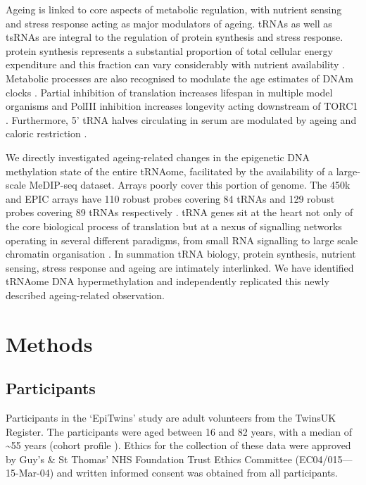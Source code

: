 \documentclass[
]{book}
\begin{document}
Ageing is linked to core aspects of metabolic regulation, with nutrient sensing and stress response acting as major modulators of ageing.
tRNAs as well as tsRNAs are integral to the regulation of protein synthesis and stress response.
protein synthesis represents a substantial proportion of total cellular energy expenditure and this fraction can vary considerably with nutrient availability \citep{Pace2006}.
Metabolic processes are also recognised to modulate the age estimates of DNAm clocks \citep{Nwanaji-Enwerem2018}.
Partial inhibition of translation increases lifespan in multiple model organisms \citep{Hansen2007} and PolIII inhibition increases longevity acting downstream of TORC1 \citep{Filer2017}.
Furthermore, 5' tRNA halves circulating in serum are modulated by ageing and caloric restriction \citep{Dhahbi2013}.

We directly investigated ageing-related changes in the epigenetic DNA methylation state of the entire tRNAome, facilitated by the availability of a large-scale MeDIP-seq dataset.
Arrays poorly cover this portion of genome.
The 450k and EPIC arrays have 110 robust probes covering 84 tRNAs and 129 robust probes covering 89 tRNAs respectively \citep{Zhou2017}.
tRNA genes sit at the heart not only of the core biological process of translation but at a nexus of signalling networks operating in several different paradigms, from small RNA signalling to large scale chromatin organisation \citep{VanBortle2017}.
In summation tRNA biology, protein synthesis, nutrient sensing, stress response and ageing are intimately interlinked.
We have identified tRNAome DNA hypermethylation and independently replicated this newly described ageing-related observation.

\newpage

\hypertarget{Methods}{%
\section{Methods}\label{Methods}}

\hypertarget{participants}{%
\subsection{Participants}\label{participants}}

Participants in the `EpiTwins' study are adult volunteers from the TwinsUK Register.
The participants were aged between 16 and 82 years, with a median of \textasciitilde55 years (cohort profile \citep{Moayyeri2013}).
Ethics for the collection of these data were approved by Guy's \& St Thomas' NHS Foundation Trust Ethics Committee (EC04/015---15-Mar-04) and written informed consent was obtained from all participants.
\end{document}
